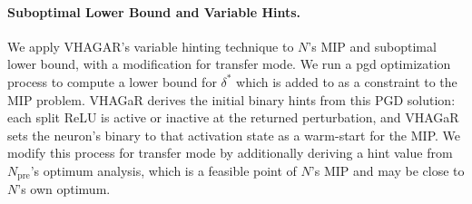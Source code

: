\documentclass[11pt]{article}
\begin{document}
\paragraph{Suboptimal Lower Bound and Variable Hints.}
\label{sec:tech:vh}

We apply VHAGAR's variable hinting technique to $N$'s MIP and suboptimal lower bound, with a modification for transfer mode.
We run a pgd optimization process to compute a lower bound for $\delta^*$ which is added to as a constraint to the MIP problem.
VHAGaR derives the initial binary hints from this PGD solution: each split ReLU is active or inactive 
at the returned perturbation, and VHAGaR sets the neuron's binary to that activation state as a warm-start for the MIP.
We modify this process for transfer mode by additionally deriving a hint value from $N_\text{pre}$'s 
optimum analysis, which is a feasible point of $N$'s MIP and may be close to $N$'s own optimum.
\end{document}
